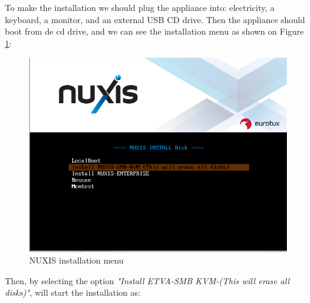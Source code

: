 To make the installation we should plug the appliance into: electricity, a keyboard, a monitor, and an external USB CD drive.
Then the appliance should boot from de cd drive, and we can see the installation menu as shown on Figure \ref{fig:boot_install_screen_standard}:

\begin{figure}[H]
	\begin{center}
	\includegraphics[scale=0.6]{screenshots/install_etva1.png}
	\caption{NUXIS installation menu}
	\label{fig:boot_install_screen_standard}
	\end{center}
\end{figure}

Then, by selecting the option \emph{"Install ETVA-SMB KVM-(This will erase all disks)"}, will start the installation as:


